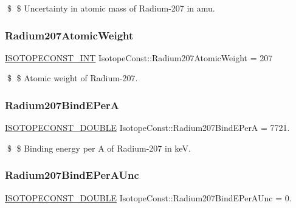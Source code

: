 \$ \$ Uncertainty in atomic mass of Radium-\/207 in amu. \mbox{\label{group___isotope_const-_radium-_ra207_ga0d1d30e7bfaa75e9e8e59b3a621b954a}} 
\subsubsection{\texorpdfstring{Radium207\+Atomic\+Weight}{Radium207AtomicWeight}}
{\footnotesize\ttfamily \mbox{\hyperlink{group___isotope_const-_macros_ga5f18360b3e99483a35c32d789e62621c}{I\+S\+O\+T\+O\+P\+E\+C\+O\+N\+S\+T\+\_\+\+I\+NT}} Isotope\+Const\+::\+Radium207\+Atomic\+Weight = 207}

\$ \$ Atomic weight of Radium-\/207. \mbox{\label{group___isotope_const-_radium-_ra207_ga6436a5dcbee424a6fad756143f23d7a7}} 
\subsubsection{\texorpdfstring{Radium207\+Bind\+E\+PerA}{Radium207BindEPerA}}
{\footnotesize\ttfamily \mbox{\hyperlink{group___isotope_const-_macros_ga8f45a7272ce02c0b4c65c44636ed719a}{I\+S\+O\+T\+O\+P\+E\+C\+O\+N\+S\+T\+\_\+\+D\+O\+U\+B\+LE}} Isotope\+Const\+::\+Radium207\+Bind\+E\+PerA = 7721.}

\$ \$ Binding energy per A of Radium-\/207 in keV. \mbox{\label{group___isotope_const-_radium-_ra207_ga54743fcfeff5502cfa5bf3644ba10952}} 
\subsubsection{\texorpdfstring{Radium207\+Bind\+E\+Per\+A\+Unc}{Radium207BindEPerAUnc}}
{\footnotesize\ttfamily \mbox{\hyperlink{group___isotope_const-_macros_ga8f45a7272ce02c0b4c65c44636ed719a}{I\+S\+O\+T\+O\+P\+E\+C\+O\+N\+S\+T\+\_\+\+D\+O\+U\+B\+LE}} Isotope\+Const\+::\+Radium207\+Bind\+E\+Per\+A\+Unc = 0.}

